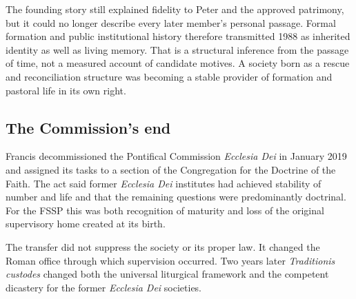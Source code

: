 The founding story still explained fidelity to Peter and the approved patrimony, but it could no longer describe every later member's personal passage. Formal formation and public institutional history therefore transmitted 1988 as inherited identity as well as living memory. That is a structural inference from the passage of time, not a measured account of candidate motives. A society born as a rescue and reconciliation structure was becoming a stable provider of formation and pastoral life in its own right.

\subsection{The Commission's end}

Francis decommissioned the Pontifical Commission \emph{Ecclesia Dei} in January 2019 and assigned its tasks to a section of the Congregation for the Doctrine of the Faith. The act said former \emph{Ecclesia Dei} institutes had achieved stability of number and life and that the remaining questions were predominantly doctrinal. For the FSSP this was both recognition of maturity and loss of the original supervisory home created at its birth.

The transfer did not suppress the society or its proper law. It changed the Roman office through which supervision occurred. Two years later \emph{Traditionis custodes} changed both the universal liturgical framework and the competent dicastery for the former \emph{Ecclesia Dei} societies.

